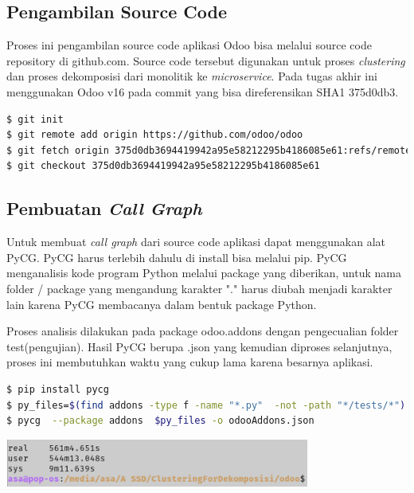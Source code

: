 \subsection{Pengambilan Source Code}
Proses ini pengambilan source code aplikasi Odoo bisa melalui source code repository di github.com. Source code tersebut digunakan untuk proses \textit{clustering} dan proses dekomposisi dari monolitik ke \textit{microservice}. Pada tugas akhir ini menggunakan Odoo v16 pada commit yang bisa direferensikan SHA1 375d0db3. 
\begin{lstlisting}[style=mystyle, language=sh, caption={Shell Script Git untuk pengambilan source code}]
$ git init
$ git remote add origin https://github.com/odoo/odoo
$ git fetch origin 375d0db3694419942a95e58212295b4186085e61:refs/remotes/origin/16.0 --depth=1
$ git checkout 375d0db3694419942a95e58212295b4186085e61
\end{lstlisting} 

\subsection{Pembuatan \textit{Call Graph}}
Untuk membuat \textit{call graph} dari source code aplikasi dapat menggunakan alat PyCG. PyCG harus terlebih dahulu di install bisa melalui pip. PyCG menganalisis kode program Python melalui package yang diberikan, untuk nama folder / package yang mengandung karakter "." harus diubah menjadi karakter lain karena PyCG membacanya dalam bentuk package Python. 

Proses analisis  dilakukan pada package odoo.addons dengan pengecualian folder test(pengujian). Hasil PyCG berupa .json yang kemudian diproses selanjutnya, proses ini membutuhkan waktu yang cukup lama karena besarnya aplikasi.
\begin{lstlisting}[style=mystyle, language=sh, caption={Shell Script untuk pembuatan \textit{call graph}}]
$ pip install pycg
$ py_files=$(find addons -type f -name "*.py"  -not -path "*/tests/*")
$ pycg  --package addons  $py_files -o odooAddons.json
\end{lstlisting}

\begin{center}
	\includegraphics[width=10cm]{img/bab_4/hasil_run_pycg.png}
	\label{fig:hasil_run_pycg}
\end{center}

